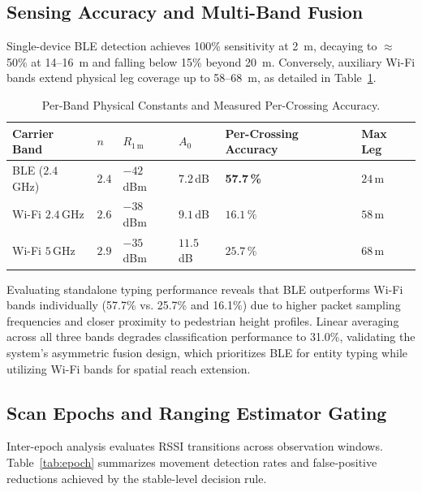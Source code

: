 \documentclass[journal,10pt]{IEEEtran}
\begin{document}
\subsection{Sensing Accuracy and Multi-Band Fusion}
Single-device BLE detection achieves 100\% sensitivity at 2~m, decaying to $\approx$50\% at 14--16~m and falling below 15\% beyond 20~m. Conversely, auxiliary Wi-Fi bands extend physical leg coverage up to 58--68~m, as detailed in Table~\ref{tab:bands}.

\begin{table}[htb!]
  \centering
  \caption{Per-Band Physical Constants and Measured Per-Crossing Accuracy.}
  \label{tab:bands}
  \footnotesize
  \begin{tabular}{@{}p{1.8cm}p{0.6cm}p{1cm}p{1cm}p{1.2cm}p{1cm}@{}}
    \toprule
    Carrier Band & $n$ & $R_{1\,\mathrm{m}}$ & $A_0$ & Per-Crossing Accuracy & Max Leg \\
    \midrule
    BLE ($2.4$\,GHz)   & $2.4$ & $-42$\,dBm & $7.2$\,dB  & \textbf{57.7\,\%} & $24$\,m \\
    Wi-Fi $2.4$\,GHz   & $2.6$ & $-38$\,dBm & $9.1$\,dB  & $16.1\,\%$        & $58$\,m \\
    Wi-Fi $5$\,GHz     & $2.9$ & $-35$\,dBm & $11.5$\,dB & $25.7\,\%$        & $68$\,m \\
    \bottomrule
  \end{tabular}
\end{table}

Evaluating standalone typing performance reveals that BLE outperforms Wi-Fi bands individually (57.7\% vs. 25.7\% and 16.1\%) due to higher packet sampling frequencies and closer proximity to pedestrian height profiles. Linear averaging across all three bands degrades classification performance to 31.0\%, validating the system's asymmetric fusion design, which prioritizes BLE for entity typing while utilizing Wi-Fi bands for spatial reach extension.

\subsection{Scan Epochs and Ranging Estimator Gating}
Inter-epoch analysis evaluates RSSI transitions across observation windows. Table~\ref{tab:epoch} summarizes movement detection rates and false-positive reductions achieved by the stable-level decision rule.
\end{document}
